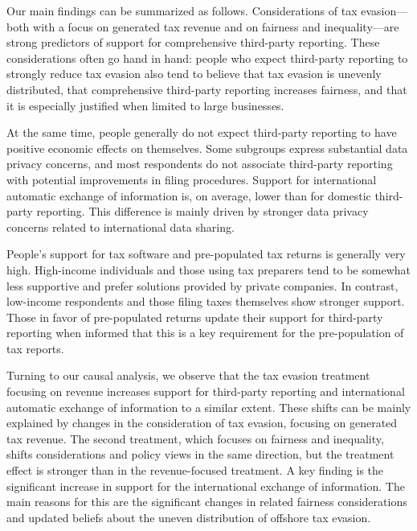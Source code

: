 \documentclass[12pt]{article}
\begin{document}
Our main findings can be summarized as follows. Considerations of tax evasion---both with a focus on generated tax revenue and on fairness and inequality---are strong predictors of support for comprehensive third-party reporting. These considerations often go hand in hand: people who expect third-party reporting to strongly reduce tax evasion also tend to believe that tax evasion is unevenly distributed, that comprehensive third-party reporting increases fairness, and that it is especially justified when limited to large businesses.

At the same time, people generally do not expect third-party reporting to have positive economic effects on themselves. Some subgroups express substantial data privacy concerns, and most respondents do not associate third-party reporting with potential improvements in filing procedures. Support for international automatic exchange of information is, on average, lower than for domestic third-party reporting. This difference is mainly driven by stronger data privacy concerns related to international data sharing.

People's support for tax software and pre-populated tax returns is generally very high. High-income individuals and those using tax preparers tend to be somewhat less supportive and prefer solutions provided by private companies. In contrast, low-income respondents and those filing taxes themselves show stronger support. Those in favor of pre-populated returns update their support for third-party reporting when informed that this is a key requirement for the pre-population of tax reports.

Turning to our causal analysis, we observe that the tax evasion treatment focusing on revenue increases support for third-party reporting and international automatic exchange of information to a similar extent. These shifts can be mainly explained by changes in the consideration of tax evasion, focusing on generated tax revenue. The second treatment, which focuses on fairness and inequality, shifts considerations and policy views in the same direction, but the treatment effect is stronger than in the revenue-focused treatment. A key finding is the significant increase in support for the international exchange of information. The main reasons for this are the significant changes in related fairness considerations and updated beliefs about the uneven distribution of offshore tax evasion. %
\end{document}
